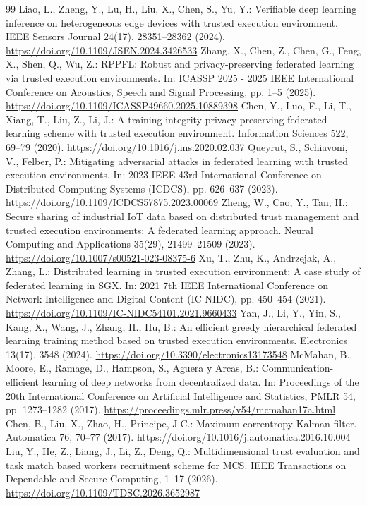 \documentclass[11pt, a4paper]{article}
\begin{document}
\begin{thebibliography}{99}
     Liao, L., Zheng, Y., Lu, H., Liu, X., Chen, S., Yu, Y.: Verifiable deep learning inference on heterogeneous edge devices with trusted execution environment. IEEE Sensors Journal 24(17), 28351--28362 (2024). \url{https://doi.org/10.1109/JSEN.2024.3426533}
     Zhang, X., Chen, Z., Chen, G., Feng, X., Shen, Q., Wu, Z.: RPPFL: Robust and privacy-preserving federated learning via trusted execution environments. In: ICASSP 2025 - 2025 IEEE International Conference on Acoustics, Speech and Signal Processing, pp. 1--5 (2025). \url{https://doi.org/10.1109/ICASSP49660.2025.10889398}
     Chen, Y., Luo, F., Li, T., Xiang, T., Liu, Z., Li, J.: A training-integrity privacy-preserving federated learning scheme with trusted execution environment. Information Sciences 522, 69--79 (2020). \url{https://doi.org/10.1016/j.ins.2020.02.037}
     Queyrut, S., Schiavoni, V., Felber, P.: Mitigating adversarial attacks in federated learning with trusted execution environments. In: 2023 IEEE 43rd International Conference on Distributed Computing Systems (ICDCS), pp. 626--637 (2023). \url{https://doi.org/10.1109/ICDCS57875.2023.00069}
     Zheng, W., Cao, Y., Tan, H.: Secure sharing of industrial IoT data based on distributed trust management and trusted execution environments: A federated learning approach. Neural Computing and Applications 35(29), 21499--21509 (2023). \url{https://doi.org/10.1007/s00521-023-08375-6}
     Xu, T., Zhu, K., Andrzejak, A., Zhang, L.: Distributed learning in trusted execution environment: A case study of federated learning in SGX. In: 2021 7th IEEE International Conference on Network Intelligence and Digital Content (IC-NIDC), pp. 450--454 (2021). \url{https://doi.org/10.1109/IC-NIDC54101.2021.9660433}
     Yan, J., Li, Y., Yin, S., Kang, X., Wang, J., Zhang, H., Hu, B.: An efficient greedy hierarchical federated learning training method based on trusted execution environments. Electronics 13(17), 3548 (2024). \url{https://doi.org/10.3390/electronics13173548}
     McMahan, B., Moore, E., Ramage, D., Hampson, S., Aguera y Arcas, B.: Communication-efficient learning of deep networks from decentralized data. In: Proceedings of the 20th International Conference on Artificial Intelligence and Statistics, PMLR 54, pp. 1273--1282 (2017). \url{https://proceedings.mlr.press/v54/mcmahan17a.html}
     Chen, B., Liu, X., Zhao, H., Principe, J.C.: Maximum correntropy Kalman filter. Automatica 76, 70--77 (2017). \url{https://doi.org/10.1016/j.automatica.2016.10.004}
     Liu, Y., He, Z., Liang, J., Li, Z., Deng, Q.: Multidimensional trust evaluation and task match based workers recruitment scheme for MCS. IEEE Transactions on Dependable and Secure Computing, 1--17 (2026). \url{https://doi.org/10.1109/TDSC.2026.3652987}
\end{thebibliography}
\end{document}
